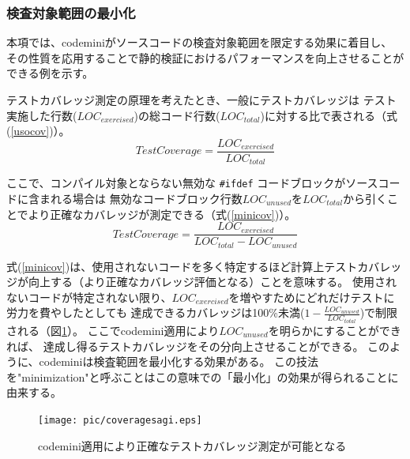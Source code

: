 \subsubsection{検査対象範囲の最小化}
\label{minigraph}
本項では、\acrshort{codemini}がソースコードの検査対象範囲を限定する効果に着目し、
その性質を応用することで静的検証におけるパフォーマンスを向上させることができる例を示す。
\par
テストカバレッジ測定の原理を考えたとき、一般にテストカバレッジは
テスト実施した行数($LOC_{exercised}$)の総コード行数($LOC_{total}$)に対する比で表される（式(\ref{usocov})）。
\begin{equation}
  TestCoverage = \frac{LOC_{exercised}}{LOC_{total}}
\label{usocov}
\end{equation}
\par
ここで、コンパイル対象とならない無効な \verb|#ifdef| コードブロックがソースコードに含まれる場合は
無効なコードブロック行数$LOC_{unused}$を$LOC_{total}$から引くことでより正確なカバレッジが測定できる（式(\ref{minicov})）。
\begin{equation}
  TestCoverage = \frac{LOC_{exercised}}{LOC_{total} - LOC_{unused}}
\label{minicov}
\end{equation}
\par
式(\ref{minicov})は、使用されないコードを多く特定するほど計算上テストカバレッジが向上する（より正確なカバレッジ評価となる）ことを意味する。
使用されないコードが特定されない限り、$LOC_{exercised}$を増やすためにどれだけテストに労力を費やしたとしても
達成できるカバレッジは100\%未満($1 - \frac{LOC_{unused}}{LOC_{total}}$)で制限される（図\ref{coveragesagi}）。
ここで\acrshort{codemini}適用により$LOC_{unused}$を明らかにすることができれば、
達成し得るテストカバレッジをその分向上させることができる。
このように、\acrshort{codemini}は検査範囲を最小化する効果がある。
この技法を"minimization"と呼ぶことはこの意味での「最小化」の効果が得られることに由来する。
\begin{figure}[ht]
  \centering
  \texttt{[image: pic/coveragesagi.eps]}
  \caption{\acrshort{codemini}適用により正確なテストカバレッジ測定が可能となる}
  \label{coveragesagi}
\end{figure}
